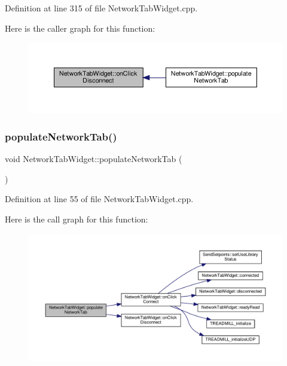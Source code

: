 Definition at line 315 of file Network\+Tab\+Widget.\+cpp.

Here is the caller graph for this function\+:
\nopagebreak
\begin{figure}[H]
\begin{center}
\leavevmode
\includegraphics[width=350pt]{class_network_tab_widget_a31b849f35ea3981762da5e7d5e951371_icgraph}
\end{center}
\end{figure}
\mbox{\label{class_network_tab_widget_ae0bc81e20f98ac4cc7cd91da440e967f}} 
\subsubsection{\texorpdfstring{populate\+Network\+Tab()}{populateNetworkTab()}}
{\footnotesize\ttfamily void Network\+Tab\+Widget\+::populate\+Network\+Tab (\begin{DoxyParamCaption}{ }\end{DoxyParamCaption})}



Definition at line 55 of file Network\+Tab\+Widget.\+cpp.

Here is the call graph for this function\+:
\nopagebreak
\begin{figure}[H]
\begin{center}
\leavevmode
\includegraphics[width=350pt]{class_network_tab_widget_ae0bc81e20f98ac4cc7cd91da440e967f_cgraph}
\end{center}
\end{figure}
\mbox{\label{class_network_tab_widget_ab1ce7580ab72e739357b7621788dd354}} 
